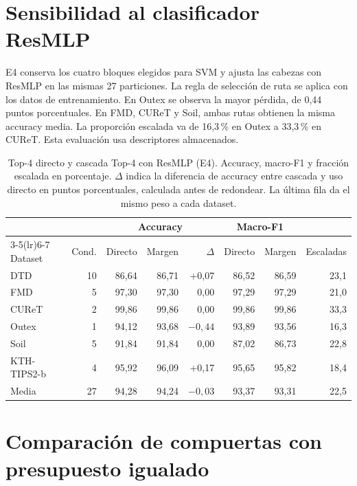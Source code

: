 \documentclass[a4paper,fleqn]{cas-sc}
\begin{document}
\section{Sensibilidad al clasificador ResMLP}

E4 conserva los cuatro bloques elegidos para SVM y ajusta las cabezas con ResMLP en las mismas 27 particiones. La regla de selección de ruta se aplica con los datos de entrenamiento. En Outex se observa la mayor pérdida, de 0,44 puntos porcentuales. En FMD, CUReT y Soil, ambas rutas obtienen la misma accuracy media. La proporción escalada va de 16,3\,\% en Outex a 33,3\,\% en CUReT. Esta evaluación usa descriptores almacenados.

\begin{table}[pos=htbp]
\centering
\caption{Top-4 directo y cascada Top-4 con ResMLP (E4). Accuracy, macro-F1 y fracción escalada en porcentaje. $\Delta$ indica la diferencia de accuracy entre cascada y uso directo en puntos porcentuales, calculada antes de redondear. La última fila da el mismo peso a cada dataset.}
\label{tab:e4-datasets}
\small
\begin{tabular}{@{}lrrrrrrr@{}}
\toprule
 & & \multicolumn{3}{c}{Accuracy} & \multicolumn{2}{c}{Macro-F1} & \\
\cmidrule(lr){3-5}\cmidrule(lr){6-7}
Dataset & Cond. & Directo & Margen & $\Delta$ & Directo & Margen & Escaladas \\
\midrule
DTD & 10 & 86,64 & 86,71 & +0,07 & 86,52 & 86,59 & 23,1 \\
FMD & 5 & 97,30 & 97,30 & 0,00 & 97,29 & 97,29 & 21,0 \\
CUReT & 2 & 99,86 & 99,86 & 0,00 & 99,86 & 99,86 & 33,3 \\
Outex & 1 & 94,12 & 93,68 & $-0{,}44$ & 93,89 & 93,56 & 16,3 \\
Soil & 5 & 91,84 & 91,84 & 0,00 & 87,02 & 86,73 & 22,8 \\
KTH-TIPS2-b & 4 & 95,92 & 96,09 & +0,17 & 95,65 & 95,82 & 18,4 \\
\midrule
Media & 27 & 94,28 & 94,24 & $-0{,}03$ & 93,37 & 93,31 & 22,5 \\
\bottomrule
\end{tabular}
\end{table}
\FloatBarrier

\section{Comparación de compuertas con presupuesto igualado}
\end{document}
